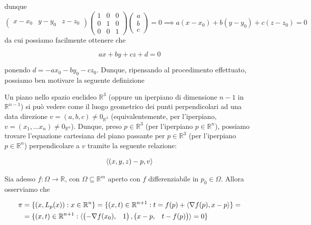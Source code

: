 dunque
\[
\begin{pmatrix}
	x - x_0 & y-y_0 & z-z_0
\end{pmatrix} \begin{pmatrix}
1 & 0 & 0 \\
0 & 1 & 0 \\
0 & 0 & 1
\end{pmatrix} \begin{pmatrix}
a \\
b \\
c
\end{pmatrix} = 0 \implies
a(x-x_0) + b(y-y_0) + c(z-z_0) = 0
\]
da cui possiamo facilmente ottenere che

\[ax+by +cz + d  = 0\]

ponendo $d = - ax_0 - by_0 - cz_0$. Dunque, ripensando al procedimento effettuato, possiamo ben motivare la seguente definizione

\vspace{0.5cm}
\begin{definition}[\textcolor{blue}{piano in uno spazio euclideo}]
Un piano nello spazio euclideo $\mathbb{R}^3$ (oppure un iperpiano di dimensione $n-1$ in $\mathbb{R}^{n-1}$) si può vedere come il luogo geometrico dei punti perpendicolari ad una data direzione $v = (a, b, c) \neq 0_{\mathbb{R}^3}$ (equivalentemente, per l'iperpiano, $v=(x_1, \ldots x_n) \neq 0_{\mathbb{R}^n}$). Dunque, preso $p \in \mathbb{R}^3$ (per l'iperpiano $p \in \mathbb{R}^n$), possiamo trovare l'equazione cartesiana del piano passante per $p \in \mathbb{R}^3$ (per l'iperpiano $p \in \mathbb{R}^n$) perpendicolare a $v$ tramite la seguente relazione:

\begin{equation}
\langle (x, y, z) - p, v \rangle
\end{equation}
\label{def:iperpiano}
\end{definition}

Sia adesso $f: \Omega \to \mathbb{R}$, con $\Omega \subseteq \mathbb{R}^m$ aperto con $f$ differenziabile in $p_0 \in \Omega$. Allora osserviamo che

\[\begin{aligned}
\pi &= \{ (x, L_p(x)) : x \in \mathbb{R}^n \} = \{ (x, t) \in \mathbb{R}^{n+1} : t = f(p) + \langle \nabla{f(p)}, x-p \rangle \} = \\
&= \{ (x, t) \in \mathbb{R}^{n+1} : \langle \begin{pmatrix} -\nabla{f(x_0)}, & 1 \end{pmatrix}, \begin{pmatrix} x-p, & t-f(p) \end{pmatrix} \rangle = 0 \}
\end{aligned}\]

